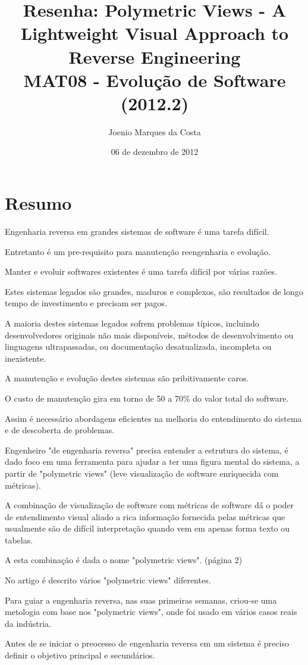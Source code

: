 \documentclass[12pt]{article}
\title{Resenha: Polymetric Views - A Lightweight Visual Approach to Reverse Engineering\cite{PolymetricViews} \\
 \large MAT08 - Evolução de Software (2012.2)}
\author{Joenio Marques da Costa}
\date{06 de dezembro de 2012}
\begin{document}
\maketitle

\section{Resumo}

Engenharia reversa em grandes sistemas de software é uma tarefa difícil.

Entretanto é um pre-requisito para manutenção reengenharia e evolução.

Manter e evoluir softwares existentes é uma tarefa difícil por várias razões.

Estes sistemas legados são grandes, maduros e complexos, são resultados de longo tempo de investimento e precisam ser pagos.

A maioria destes sistemas legados sofrem problemas típicos, incluindo desenvolvedores originais não mais disponíveis, métodos de desenvolvimento ou linguagens ultrapassadas, ou documentação desatualizada, incompleta ou inexistente.

A manutenção e evolução destes sistemas são pribitivamente caros.

O custo de manutenção gira em torno de 50 a 70\% do valor total do software.

Assim é necessário abordagens eficientes na melhoria do entendimento do sistema e de descoberta de problemas.

Engenheiro "de engenharia reversa" precisa entender a estrutura do sistema, é dado foco em uma ferramenta para ajudar a ter uma figura mental do sistema, a partir de "polymetric views" (leve visualização de software enriquecida com métricas).

A combinação de visualização de software com métricas de software dá o poder de entendimento visual aliado a rica informação fornecida pelas métricas que usualmente são de difícil interpretação quando vem em apenas forma texto ou tabelas.

A esta combinação é dada o nome "polymetric views". (página 2)

No artigo é descrito vários "polymetric views" diferentes.

Para guiar a engenharia reversa, nas suas primeiras semanas, criou-se uma metologia com base nos "polymetric views", onde foi usado em vários casos reais da indústria.

Antes de se iniciar o preocesso de engenharia reversa em um sistema é preciso definir o objetivo principal e secundários.
\end{document}
